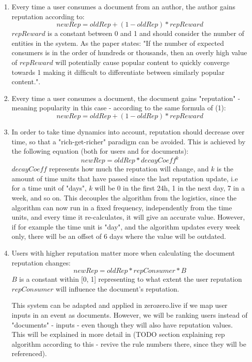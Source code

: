 \begin{enumerate}
    \item Every time a user consumes a document from an author, the author gains reputation according to:
    \[newRep = oldRep + (1 - oldRep) * repReward\]
    $repReward$ is a constant between 0 and 1 and should consider the number of entities in the system. As the paper states: "If the number of expected consumers is in the order of hundreds or thousands, then an overly high value of $repReward$ will potentially cause popular content to quickly converge towards 1 making it difﬁcult to differentiate between similarly popular content.".
    \item Every time a user consumes a document, the document gains "reputation" - meaning popularity in this case - according to the same formula of (1):
    \[newRep = oldRep + (1 - oldRep) * repReward\]
    \item In order to take time dynamics into account, reputation should decrease over time, so that a "rich-get-richer" paradigm can be avoided. This is achieved by the following equation (both for users and for documents):
    \[newRep = oldRep * decayCoeff^k\]
    $decayCoeff$ represents how much the reputation will change, and $k$ is the amount of time units that have passed since the last reputation update, i.e for a time unit of "days", $k$ will be 0 in the first 24h, 1 in the next day, 7 in a week, and so on. This decouples the algorithm from the logistics, since the algorithm can now run in a fixed frequency, independently from the time units, and every time it re-calculates, it will give an accurate value. However, if for example the time unit is "day", and the algorithm updates every week only, there will be an offset of 6 days where the value will be outdated.
    \item Users with higher reputation matter more when calculating the document reputation changes:
    \[newRep = oldRep * repConsumer * B\]
    $B$ is a constant within [0, 1] representing to what extent the user reputation $repConsumer$ will influence the document's reputation.

    This system can be adapted and applied in zerozero.live if we map user inputs in an event as documents. However, we will be ranking users instead of "documents" - inputs - even though they will also have reputation values. This will be explained in more detail in (TODO section explaining rep algorithm according to this - revive the rule numbers there, since they will be referenced).
    
\end{enumerate} 